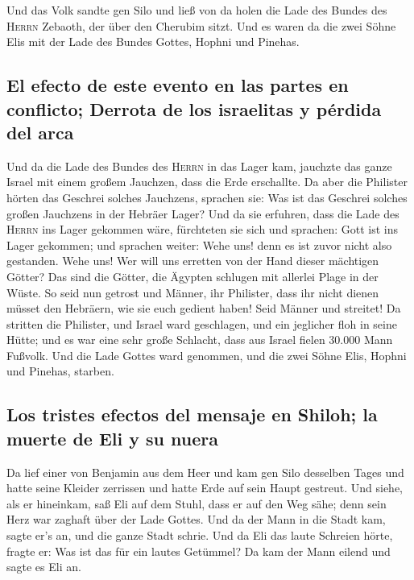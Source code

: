  Und das Volk sandte gen Silo und ließ von da holen die
Lade des Bundes des \textsc{Herrn} Zebaoth, der über den Cherubim sitzt.
Und es waren da die zwei Söhne Elis mit der Lade des Bundes Gottes,
Hophni und Pinehas.

\hypertarget{el-efecto-de-este-evento-en-las-partes-en-conflicto-derrota-de-los-israelitas-y-puxe9rdida-del-arca}{%
\subsection{El efecto de este evento en las partes en conflicto; Derrota
de los israelitas y pérdida del
arca}\label{el-efecto-de-este-evento-en-las-partes-en-conflicto-derrota-de-los-israelitas-y-puxe9rdida-del-arca}}

 Und da die Lade des Bundes des \textsc{Herrn} in das
Lager kam, jauchzte das ganze Israel mit einem großem Jauchzen, dass die
Erde erschallte.  Da aber die Philister hörten das
Geschrei solches Jauchzens, sprachen sie: Was ist das Geschrei solches
großen Jauchzens in der Hebräer Lager? Und da sie erfuhren, dass die
Lade des \textsc{Herrn} ins Lager gekommen wäre, 
fürchteten sie sich und sprachen: Gott ist ins Lager gekommen; und
sprachen weiter: Wehe uns! denn es ist zuvor nicht also gestanden.
 Wehe uns! Wer will uns erretten von der Hand dieser
mächtigen Götter? Das sind die Götter, die Ägypten schlugen mit allerlei
Plage in der Wüste.  So seid nun getrost und Männer, ihr
Philister, dass ihr nicht dienen müsset den Hebräern, wie sie euch
gedient haben! Seid Männer und streitet!  Da stritten die
Philister, und Israel ward geschlagen, und ein jeglicher floh in seine
Hütte; und es war eine sehr große Schlacht, dass aus Israel fielen
30.000 Mann Fußvolk.  Und die Lade Gottes ward genommen,
und die zwei Söhne Elis, Hophni und Pinehas, starben.

\hypertarget{los-tristes-efectos-del-mensaje-en-shiloh-la-muerte-de-eli-y-su-nuera}{%
\subsection{Los tristes efectos del mensaje en Shiloh; la muerte de Eli
y su
nuera}\label{los-tristes-efectos-del-mensaje-en-shiloh-la-muerte-de-eli-y-su-nuera}}

 Da lief einer von Benjamin aus dem Heer und kam gen Silo
desselben Tages und hatte seine Kleider zerrissen und hatte Erde auf
sein Haupt gestreut.  Und siehe, als er hineinkam, saß
Eli auf dem Stuhl, dass er auf den Weg sähe; denn sein Herz war zaghaft
über der Lade Gottes. Und da der Mann in die Stadt kam, sagte er's an,
und die ganze Stadt schrie.  Und da Eli das laute
Schreien hörte, fragte er: Was ist das für ein lautes Getümmel? Da kam
der Mann eilend und sagte es Eli an.

